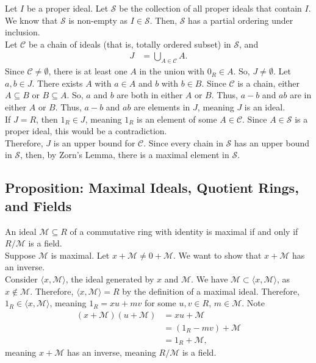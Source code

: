 \documentclass[10pt]{extarticle}
\begin{document}
  Let $I$ be a proper ideal. Let $\mathcal{S}$ be the collection of all proper ideals that contain $I$. We know that $\mathcal{S}$ is non-empty as $I\in \mathcal{S}$. Then, $\mathcal{S}$ has a partial ordering under inclusion.\\

  Let $\mathcal{C}$ be a chain of ideals (that is, totally ordered subset) in $\mathcal{S}$, and 
  \begin{align*}
    J &= \bigcup_{A\in\mathcal{C}}A.
  \end{align*}
  Since $\mathcal{C} \neq \emptyset$, there is at least one $A$ in the union with $0_R \in A$. So, $J \neq \emptyset$. Let $a,b\in J$. There exists $A$ with $a\in A$ and $b$ with $b\in B$. Since $\mathcal{C}$ is a chain, either $A\subseteq B$ or $B\subseteq A$. So, $a$ and $b$ are both in either $A$ or $B$. Thus, $a-b$ and $ab$ are in either $A$ or $B$. Thus, $a-b$ and $ab$ are elements in $J$, meaning $J$ is an ideal.\\

  If $J = R$, then $1_R \in J$, meaning $1_R$ is an element of some $A\in \mathcal{C}$. Since $A\in \mathcal{S}$ is a proper ideal, this would be a contradiction.\\

  Therefore, $J$ is an upper bound for $\mathcal{C}$. Since every chain in $\mathcal{S}$ has an upper bound in $\mathcal{S}$, then, by Zorn's Lemma, there is a maximal element in $\mathcal{S}$.
  
  \subsection{Proposition: Maximal Ideals, Quotient Rings, and Fields}%
  An ideal $\mathcal{M}\subseteq R$ of a commutative ring with identity is maximal if and only if $R/\mathcal{M}$ is a field.\\

  Suppose $\mathcal{M}$ is maximal. Let $x + \mathcal{M} \neq 0 + \mathcal{M}$. We want to show that $x + \mathcal{M}$ has an inverse.\\

  Consider $\langle x,\mathcal{M}\rangle$, the ideal generated by $x$ and $\mathcal{M}$. We have $\mathcal{M} \subset \langle x,\mathcal{M}\rangle$, as $x\notin \mathcal{M}$. Therefore, $\langle x,\mathcal{M}\rangle = R$ by the definition of a maximal ideal. Therefore, $1_R \in \langle x,\mathcal{M}\rangle$, meaning $1_R = xu + mv$ for some $u,v\in R$, $m\in \mathcal{M}$. Note
  \begin{align*}
    (x + \mathcal{M})(u + \mathcal{M}) &= xu + \mathcal{M}\\
                                       &= (1_R - mv) + \mathcal{M}\\
                                       &= 1_R + \mathcal{M},
  \end{align*}
  meaning $x + \mathcal{M}$ has an inverse, meaning $R/\mathcal{M}$ is a field.\\
\end{document}
